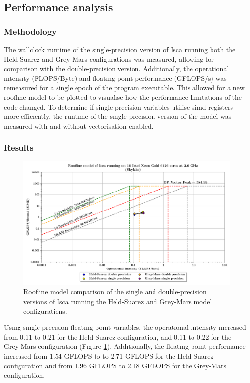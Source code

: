 \documentclass[a4paper,11pt]{report}
\begin{document}
\subsection{Performance analysis}

\subsubsection{Methodology}
The wallclock runtime of the single-precision version of Isca running both the Held-Suarez and Grey-Mars configurations was measured, allowing for comparison with the double-precision version. Additionally, the operational intensity (FLOPS/Byte) and floating point performance (GFLOPS/s) was remeasured for a single epoch of the program executable. This allowed for a new roofline model to be plotted to visualise how the performance limitations of the code changed. To determine if single-precision variables utilise \gls{simd} registers more efficiently, the runtime of the single-precision version of the model was measured with and without vectorisation enabled. 

\subsubsection{Results}
\begin{figure}[H]
\begin{center}
\includegraphics[width=\textwidth]{img/roofline_model_bluepebble_precision.pdf}
\caption[Roofline model comparison of single and double-precision arithmetic]{Roofline model comparison of the single and double-precision versions of Isca running the Held-Suarez and Grey-Mars model configurations.}
\label{fig:roofline-opt}
\end{center}
\end{figure}
Using single-precision floating point variables, the operational intensity increased from 0.11 to 0.21 for the Held-Suarez configuration, and 0.11 to 0.22 for the Grey-Mars configuration (Figure \ref{fig:roofline-opt}). Additionally, the floating point performance increased from 1.54 GFLOPS to to 2.71 GFLOPS for the Held-Suarez configuration and from 1.96 GFLOPS to 2.18 GFLOPS for the Grey-Mars configuration.
\end{document}
